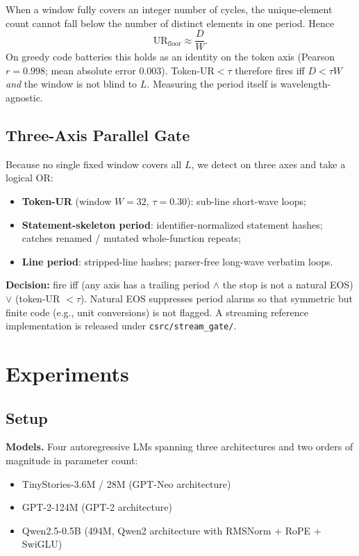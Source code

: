 \documentclass[11pt]{article}
\begin{document}
When a window fully covers an integer number of cycles, the unique-element count cannot fall below the number of distinct elements in one period. Hence
\[
\mathrm{UR}_{\mathrm{floor}} \approx \frac{D}{W}.
\]
On greedy code batteries this holds as an identity on the token axis (Pearson $r=0.998$; mean absolute error $0.003$). Token-UR$<\tau$ therefore fires iff $D < \tau W$ \emph{and} the window is not blind to $L$. Measuring the period itself is wavelength-agnostic.

\subsection{Three-Axis Parallel Gate}
\label{sec:method-gate}

Because no single fixed window covers all $L$, we detect on three axes and take a logical OR:
\begin{itemize}
    \item \textbf{Token-UR} (window $W{=}32$, $\tau{=}0.30$): sub-line short-wave loops;
    \item \textbf{Statement-skeleton period}: identifier-normalized statement hashes; catches renamed / mutated whole-function repeats;
    \item \textbf{Line period}: stripped-line hashes; parser-free long-wave verbatim loops.
\end{itemize}
\textbf{Decision:} fire iff (any axis has a trailing period $\land$ the stop is not a natural EOS) $\lor$ (token-UR $<\tau$). Natural EOS suppresses period alarms so that symmetric but finite code (e.g., unit conversions) is not flagged. A streaming reference implementation is released under \texttt{csrc/stream\_gate/}.

\section{Experiments}

\subsection{Setup}
\label{sec:setup}

\textbf{Models.} Four autoregressive LMs spanning three architectures and two orders of magnitude in parameter count:
\begin{itemize}
    \item TinyStories-3.6M / 28M (GPT-Neo architecture) \citep{eldan2023}
    \item GPT-2-124M (GPT-2 architecture) \citep{radford2019}
    \item Qwen2.5-0.5B (494M, Qwen2 architecture with RMSNorm + RoPE + SwiGLU) \citep{bai2023}
\end{itemize}
\end{document}
